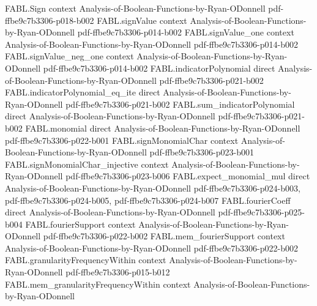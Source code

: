 \begin{theorem}
\label{FABL.fourierWeightAtLevel_majority_strict_decreasing}
\leanok
{}
\proofstep
  {FABL.Sign}
  {context}
  {Analysis-of-Boolean-Functions-by-Ryan-ODonnell}
  {pdf-ffbe9c7b3306-p018-b002}
\proofstep
  {FABL.signValue}
  {context}
  {Analysis-of-Boolean-Functions-by-Ryan-ODonnell}
  {pdf-ffbe9c7b3306-p014-b002}
\proofstep
  {FABL.signValue_one}
  {context}
  {Analysis-of-Boolean-Functions-by-Ryan-ODonnell}
  {pdf-ffbe9c7b3306-p014-b002}
\proofstep
  {FABL.signValue_neg_one}
  {context}
  {Analysis-of-Boolean-Functions-by-Ryan-ODonnell}
  {pdf-ffbe9c7b3306-p014-b002}
\proofstep
  {FABL.indicatorPolynomial}
  {direct}
  {Analysis-of-Boolean-Functions-by-Ryan-ODonnell}
  {pdf-ffbe9c7b3306-p021-b002}
\proofstep
  {FABL.indicatorPolynomial_eq_ite}
  {direct}
  {Analysis-of-Boolean-Functions-by-Ryan-ODonnell}
  {pdf-ffbe9c7b3306-p021-b002}
\proofstep
  {FABL.sum_indicatorPolynomial}
  {direct}
  {Analysis-of-Boolean-Functions-by-Ryan-ODonnell}
  {pdf-ffbe9c7b3306-p021-b002}
\proofstep
  {FABL.monomial}
  {direct}
  {Analysis-of-Boolean-Functions-by-Ryan-ODonnell}
  {pdf-ffbe9c7b3306-p022-b001}
\proofstep
  {FABL.signMonomialChar}
  {context}
  {Analysis-of-Boolean-Functions-by-Ryan-ODonnell}
  {pdf-ffbe9c7b3306-p023-b001}
\proofstep
  {FABL.signMonomialChar_injective}
  {context}
  {Analysis-of-Boolean-Functions-by-Ryan-ODonnell}
  {pdf-ffbe9c7b3306-p023-b006}
\proofstep
  {FABL.expect_monomial_mul}
  {direct}
  {Analysis-of-Boolean-Functions-by-Ryan-ODonnell}
  {pdf-ffbe9c7b3306-p024-b003,
    pdf-ffbe9c7b3306-p024-b005,
    pdf-ffbe9c7b3306-p024-b007}
\proofstep
  {FABL.fourierCoeff}
  {direct}
  {Analysis-of-Boolean-Functions-by-Ryan-ODonnell}
  {pdf-ffbe9c7b3306-p025-b004}
\proofstep
  {FABL.fourierSupport}
  {context}
  {Analysis-of-Boolean-Functions-by-Ryan-ODonnell}
  {pdf-ffbe9c7b3306-p022-b002}
\proofstep
  {FABL.mem_fourierSupport}
  {context}
  {Analysis-of-Boolean-Functions-by-Ryan-ODonnell}
  {pdf-ffbe9c7b3306-p022-b002}
\proofstep
  {FABL.granularityFrequencyWithin}
  {context}
  {Analysis-of-Boolean-Functions-by-Ryan-ODonnell}
  {pdf-ffbe9c7b3306-p015-b012}
\proofstep
  {FABL.mem_granularityFrequencyWithin}
  {context}
  {Analysis-of-Boolean-Functions-by-Ryan-ODonnell}

\end{theorem}
